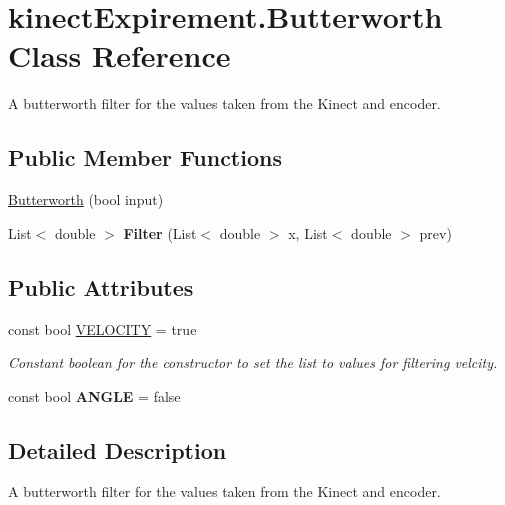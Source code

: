 \hypertarget{classkinect_expirement_1_1_butterworth}{}\section{kinect\+Expirement.\+Butterworth Class Reference}
\label{classkinect_expirement_1_1_butterworth}


A butterworth filter for the values taken from the Kinect and encoder. 


\subsection*{Public Member Functions}
\begin{DoxyCompactItemize}
\item 
\hyperlink{classkinect_expirement_1_1_butterworth_a37322f18a1f8f59271df8aac36e79f26}{Butterworth} (bool input)
\item 
List$<$ double $>$ {\bfseries Filter} (List$<$ double $>$ x, List$<$ double $>$ prev)\hypertarget{classkinect_expirement_1_1_butterworth_a0e51ad9aa7218b63b901cfd4e71ea75b}{}\label{classkinect_expirement_1_1_butterworth_a0e51ad9aa7218b63b901cfd4e71ea75b}

\end{DoxyCompactItemize}
\subsection*{Public Attributes}
\begin{DoxyCompactItemize}
\item 
const bool \hyperlink{classkinect_expirement_1_1_butterworth_afc717929ffc8d554b7e0263e2b06806a}{V\+E\+L\+O\+C\+I\+TY} = true
\begin{DoxyCompactList}\small\item\em Constant boolean for the constructor to set the list to values for filtering velcity.\end{DoxyCompactList}\item 
const bool {\bfseries A\+N\+G\+LE} = false\hypertarget{classkinect_expirement_1_1_butterworth_ac991123445c654cb0da7d7841e313b2c}{}\label{classkinect_expirement_1_1_butterworth_ac991123445c654cb0da7d7841e313b2c}

\end{DoxyCompactItemize}


\subsection{Detailed Description}
A butterworth filter for the values taken from the Kinect and encoder.



